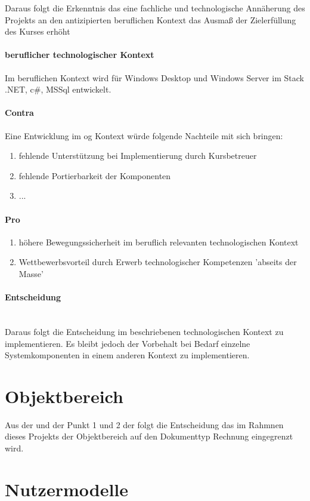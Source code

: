 Daraus folgt die Erkenntnis das eine fachliche und technologische Annäherung des Projekts an den antizipierten beruflichen Kontext das Ausmaß der Zielerfüllung des Kurses erhöht

\paragraph{beruflicher technologischer Kontext}

Im beruflichen Kontext wird für Windows Desktop und Windows Server im Stack .NET, c\n#, MSSql entwickelt.


\paragraph{Contra}
Eine Entwicklung im og Kontext würde folgende Nachteile mit sich bringen:

\begin{enumerate}
\item fehlende Unterstützung bei Implementierung durch Kursbetreuer
\item fehlende Portierbarkeit der Komponenten
\item ...
\end{enumerate}


\paragraph{Pro}

\begin{enumerate}
\item höhere Bewegungssicherheit im beruflich relevanten technologischen Kontext
\item Wettbewerbsvorteil durch Erwerb technologischer Kompetenzen 'abseits der Masse'
\end{enumerate}

\paragraph{Entscheidung}\\
Daraus folgt die Entscheidung im beschriebenen technologischen Kontext zu implementieren. Es bleibt jedoch der Vorbehalt 
bei Bedarf einzelne Systemkomponenten in einem anderen Kontext zu implementieren.
%
%
\section{Objektbereich}

Aus der  und der Punkt 1 und 2 der  folgt
die Entscheidung das im Rahmnen dieses Projekts der Objektbereich auf den Dokumenttyp Rechnung eingegrenzt wird.


\section{Nutzermodelle}


